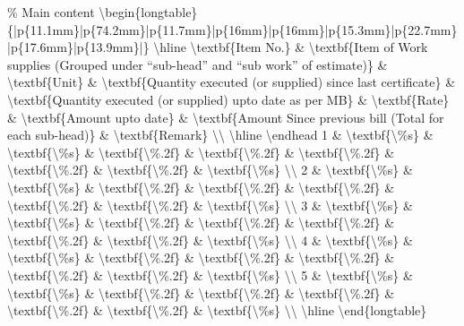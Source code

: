 \% Main content
\textbackslash{}begin\{longtable\}\{|p\{11.1mm\}|p\{74.2mm\}|p\{11.7mm\}|p\{16mm\}|p\{16mm\}|p\{15.3mm\}|p\{22.7mm\}|p\{17.6mm\}|p\{13.9mm\}|\}
\textbackslash{}hline
\textbackslash{}textbf\{Item No.\} \& \textbackslash{}textbf\{Item of Work supplies (Grouped under ``sub-head'' and ``sub work'' of estimate)\} \& \textbackslash{}textbf\{Unit\} \& \textbackslash{}textbf\{Quantity executed (or supplied) since last certificate\} \& \textbackslash{}textbf\{Quantity executed (or supplied) upto date as per MB\} \& \textbackslash{}textbf\{Rate\} \& \textbackslash{}textbf\{Amount upto date\} \& \textbackslash{}textbf\{Amount Since previous bill (Total for each sub-head)\} \& \textbackslash{}textbf\{Remark\} \textbackslash{}\textbackslash{}
\textbackslash{}hline
\textbackslash{}endhead
1 \& \textbackslash{}textbf\{\textbackslash{}\%s\} \& \textbackslash{}textbf\{\textbackslash{}\%s\} \& \textbackslash{}textbf\{\textbackslash{}\%.2f\} \& \textbackslash{}textbf\{\textbackslash{}\%.2f\} \& \textbackslash{}textbf\{\textbackslash{}\%.2f\} \& \textbackslash{}textbf\{\textbackslash{}\%.2f\} \& \textbackslash{}textbf\{\textbackslash{}\%.2f\} \& \textbackslash{}textbf\{\textbackslash{}\%s\} \textbackslash{}\textbackslash{}
2 \& \textbackslash{}textbf\{\textbackslash{}\%s\} \& \textbackslash{}textbf\{\textbackslash{}\%s\} \& \textbackslash{}textbf\{\textbackslash{}\%.2f\} \& \textbackslash{}textbf\{\textbackslash{}\%.2f\} \& \textbackslash{}textbf\{\textbackslash{}\%.2f\} \& \textbackslash{}textbf\{\textbackslash{}\%.2f\} \& \textbackslash{}textbf\{\textbackslash{}\%.2f\} \& \textbackslash{}textbf\{\textbackslash{}\%s\} \textbackslash{}\textbackslash{}
3 \& \textbackslash{}textbf\{\textbackslash{}\%s\} \& \textbackslash{}textbf\{\textbackslash{}\%s\} \& \textbackslash{}textbf\{\textbackslash{}\%.2f\} \& \textbackslash{}textbf\{\textbackslash{}\%.2f\} \& \textbackslash{}textbf\{\textbackslash{}\%.2f\} \& \textbackslash{}textbf\{\textbackslash{}\%.2f\} \& \textbackslash{}textbf\{\textbackslash{}\%.2f\} \& \textbackslash{}textbf\{\textbackslash{}\%s\} \textbackslash{}\textbackslash{}
4 \& \textbackslash{}textbf\{\textbackslash{}\%s\} \& \textbackslash{}textbf\{\textbackslash{}\%s\} \& \textbackslash{}textbf\{\textbackslash{}\%.2f\} \& \textbackslash{}textbf\{\textbackslash{}\%.2f\} \& \textbackslash{}textbf\{\textbackslash{}\%.2f\} \& \textbackslash{}textbf\{\textbackslash{}\%.2f\} \& \textbackslash{}textbf\{\textbackslash{}\%.2f\} \& \textbackslash{}textbf\{\textbackslash{}\%s\} \textbackslash{}\textbackslash{}
5 \& \textbackslash{}textbf\{\textbackslash{}\%s\} \& \textbackslash{}textbf\{\textbackslash{}\%s\} \& \textbackslash{}textbf\{\textbackslash{}\%.2f\} \& \textbackslash{}textbf\{\textbackslash{}\%.2f\} \& \textbackslash{}textbf\{\textbackslash{}\%.2f\} \& \textbackslash{}textbf\{\textbackslash{}\%.2f\} \& \textbackslash{}textbf\{\textbackslash{}\%.2f\} \& \textbackslash{}textbf\{\textbackslash{}\%s\} \textbackslash{}\textbackslash{}
\textbackslash{}hline
\textbackslash{}end\{longtable\}

